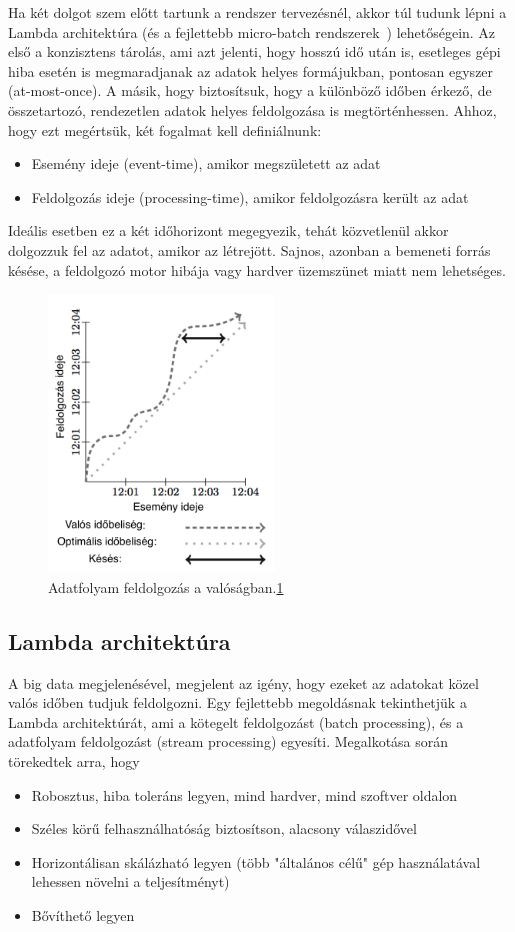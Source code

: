 \documentclass[a4paper,12pt]{article}
\begin{document}
Ha két dolgot szem előtt tartunk a rendszer tervezésnél, akkor túl tudunk lépni a Lambda architektúra (és a fejlettebb micro-batch rendszerek~\cite{microbatch}) lehetőségein. Az első a konzisztens tárolás, ami azt jelenti, hogy hosszú idő után is, esetleges gépi hiba esetén is megmaradjanak az adatok helyes formájukban, pontosan egyszer (at-most-once). A másik, hogy biztosítsuk, hogy a különböző időben érkező, de összetartozó, rendezetlen adatok helyes feldolgozása is megtörténhessen. Ahhoz, hogy ezt megértsük, két fogalmat kell definiálnunk:
\begin{itemize}
\item Esemény ideje (event-time), amikor megszületett az adat
\item Feldolgozás ideje (processing-time), amikor feldolgozásra került az adat
\end{itemize}
Ideális esetben ez a két időhorizont megegyezik, tehát közvetlenül akkor dolgozzuk fel az adatot, amikor az létrejött. Sajnos, azonban a bemeneti forrás késése, a feldolgozó motor hibája vagy hardver üzemszünet miatt nem lehetséges. 
 
\begin{figure}[ht!]
\centering
\includegraphics[width=60mm]{img/skew.png}
\caption{Adatfolyam feldolgozás a valóságban.\ref{skew} \label{skew}} 
\end{figure}

\subsection{Lambda architektúra}
A big data megjelenésével, megjelent az igény, hogy ezeket az adatokat közel valós időben tudjuk feldolgozni. Egy fejlettebb megoldásnak tekinthetjük a Lambda architektúrát, ami a kötegelt feldolgozást (batch processing), és a adatfolyam feldolgozást (stream processing) egyesíti. Megalkotása során törekedtek arra, hogy 
\begin{itemize}
\item Robosztus, hiba toleráns legyen, mind hardver, mind szoftver oldalon
\item Széles körű felhasználhatóság biztosítson, alacsony válaszidővel
\item Horizontálisan skálázható legyen (több "általános célű" gép használatával lehessen növelni a teljesítményt)
\item Bővíthető legyen
\end{itemize}
\end{document}
